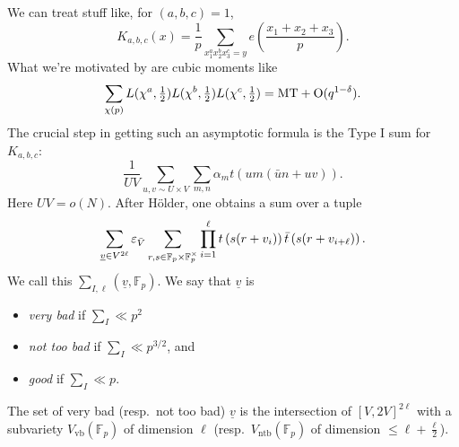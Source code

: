 \documentclass[reqno]{amsart} 
\numberwithin{theorem}{section}
\numberwithin{equation}{section}
\begin{document}
\begin{example}
  We can treat stuff like, for $(a, b, c) = 1$,
  \begin{equation*}
    K_{a, b, c}(x) = \frac{1}{p}
    \sum_{x_1^a x_2^b x_3^c = y}
    e \left( \frac{x_1 + x_2 + x_3}{p} \right).
  \end{equation*}
  What we're motivated by are cubic moments like
  \begin{equation*}
    \sum_{\chi(p)}
    L(\chi^a, \tfrac{1}{2}) L(\chi^b,\tfrac{1}{2}) L(\chi^c, \tfrac{1}{2}) = \mathrm{MT} + \operatorname{O}(q^{1 - \delta}).
  \end{equation*}
  The crucial step in getting such an asymptotic formula is the Type I sum for $K_{a, b, c}$:
  \begin{equation*}
    \frac{1}{U V} \sum_{u, v \sim U \times V}
    \sum_{m, n}
    \alpha_m
    t(u m(\bar{u} n + u v)).
  \end{equation*}
  Here $U V = o(N)$.  After Hölder, one obtains a sum over a tuple
  \begin{equation*}
    \sum_{\underline{v} \in V^{2 \ell}} \varepsilon_{\bar{V}}
    \sum_{r, s \in \mathbb{F}_p \times \mathbb{F}_p^\times}
    \prod_{i = 1}^{\ell}
    t \left( s(r + v_i) \right)
    \bar{t} \left( s(r + v_{i + \ell}) \right).
  \end{equation*}
  We call this $\sum_{I, \ell}(\underline{v}, \mathbb{F}_p)$.  We say that $\underline{v}$ is
  \begin{itemize}
  \item \emph{very bad} if $\sum_{I} \ll p^2$
  \item \emph{not too bad} if $\sum_I \ll p^{3/2}$, and
  \item \emph{good} if $\sum_I \ll p$.
  \end{itemize}
  The set of very bad (resp.\ not too bad) $\underline{v}$ is the intersection of $[V, 2 V]^{2 \ell}$ with a subvariety $V_{\mathrm{v b}}(\mathbb{F}_p)$ of dimension $\ell$ (resp.\ $V_{\mathrm{n t b}}(\mathbb{F}_p)$ of dimension $\leq \ell + \frac{\ell}{2}$).
\end{example}
\end{document}
